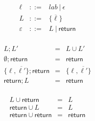 \documentclass{article}
\newcommand{\type}{\mathit{type}}
\newcommand{\seq}[1]{\overline{{#1}}}
\newcommand{\mathjs}[1]{\mbox{\texttt{{#1}}}}
\newcommand{\bit}{\mathtt{bit}}
\newcommand{\unsigned}{\mathtt{unsigned}}
\newcommand{\signed}{\mathtt{signed}}
\newcommand{\double}{\mathtt{double}}
\newcommand{\str}{\mathtt{string}}
\newcommand{\nul}{\mathtt{null}}
\newcommand{\mustret}{\mathsf{return}}
\newcommand{\seqcomp}{\mathrel{;}}
\newcommand{\getprop}[2]{{#1}\mathjs{[}{#2}\mathjs{]}}
\newcommand{\longlong}[2]{\mathjs{[}{#1},{#2}\mathjs{]}}
\newcommand{\toint}[1]{{#1}\mathjs{ | 0}}
\newcommand{\touint}[1]{{#1}\mathjs{ >>> 0}}
\begin{document}
\[
\begin{array}{rcl}
\ell        & ::= & \mathit{lab} ~|~ \epsilon \\
L           & ::= & \{ \seq{\ell} \} \\
\varepsilon & ::= & L ~|~ \mustret \\
\end{array}
\]

\[
\begin{array}{rcl}
L                       \seqcomp L'       & = & L \cup L' \\
\emptyset               \seqcomp \mustret & = & \mustret \\
\{ \ell, \seq{\ell'} \} \seqcomp \mustret & = & \{ \ell, \seq{\ell'} \} \\
\mustret                \seqcomp L        & = & \mustret \\
\end{array}
\]

\[
\begin{array}{rcl}
L        \cup \mustret & = & L \\
\mustret \cup L        & = & L \\
\mustret \cup \mustret & = & \mustret \\
\end{array}
\]

\end{document}
